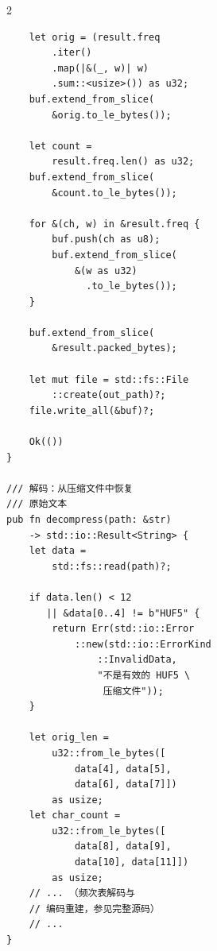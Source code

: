 {\begin{multicols}{2}
\begin{verbatim}
    let orig = (result.freq
        .iter()
        .map(|&(_, w)| w)
        .sum::<usize>()) as u32;
    buf.extend_from_slice(
        &orig.to_le_bytes());

    let count =
        result.freq.len() as u32;
    buf.extend_from_slice(
        &count.to_le_bytes());

    for &(ch, w) in &result.freq {
        buf.push(ch as u8);
        buf.extend_from_slice(
            &(w as u32)
              .to_le_bytes());
    }

    buf.extend_from_slice(
        &result.packed_bytes);

    let mut file = std::fs::File
        ::create(out_path)?;
    file.write_all(&buf)?;

    Ok(())
}

/// 解码：从压缩文件中恢复
/// 原始文本
pub fn decompress(path: &str)
    -> std::io::Result<String> {
    let data =
        std::fs::read(path)?;

    if data.len() < 12
       || &data[0..4] != b"HUF5" {
        return Err(std::io::Error
            ::new(std::io::ErrorKind
                ::InvalidData,
                "不是有效的 HUF5 \
                 压缩文件"));
    }

    let orig_len =
        u32::from_le_bytes([
            data[4], data[5],
            data[6], data[7]])
        as usize;
    let char_count =
        u32::from_le_bytes([
            data[8], data[9],
            data[10], data[11]])
        as usize;
    // ... （频次表解码与
    // 编码重建，参见完整源码）
    // ...
}
\end{verbatim}

\end{multicols}
}
